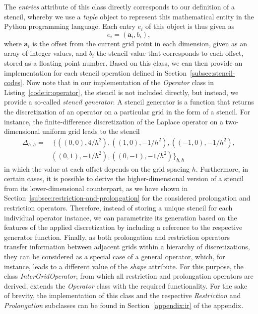 The \emph{entries} attribute of this class directly corresponds to our definition of a stencil, whereby we use a \emph{tuple} object to represent this mathematical entity in the Python programming language.
Each entry $e_i$ of this object is thus given as
\begin{equation}
	e_i = \left(\bm{a}_i, b_i \right),
\end{equation} 
where $\bm{a}_i$ is the offset from the current grid point in each dimension, given as an array of integer values, and $b_i$ the stencil value that corresponds to each offset, stored as a floating point number.
Based on this class, we can then provide an implementation for each stencil operation defined in Section~\ref{subsec:stencil-codes}.
Now note that in our implementation of the \emph{Operator} class in Listing~\ref{code:ir:operator}, the stencil is not included directly, but instead, we provide a so-called \emph{stencil generator}.
A stencil generator is a function that returns the discretization of an operator on a particular grid in the form of a stencil.
For instance, the finite-difference discretization of the Laplace operator on a two-dimensional uniform grid leads to the stencil 
\begin{equation*}
	\begin{split}
		\Delta_{h,h} = & \; \big\{ \left( \left( 0,0 \right), 4 / h^2 \right), \left(\left(1,0\right), -1/h^2\right), \left(\left(-1,0\right), -1 / h^2\right), \\ & \left(\left(0,1\right), -1/h^2\right), \left(\left(0,-1\right), -1/h^2\right) \big\}_{h,h}
	\end{split}
\end{equation*}
in which the value at each offset depends on the grid spacing $h$.
Furthermore, in certain cases, it is possible to derive the higher-dimensional version of a stencil from its lower-dimensional counterpart, as we have shown in Section~\ref{subsec:restriction-and-prolongation} for the considered prolongation and restriction operators.
Therefore, instead of storing a unique stencil for each individual operator instance, we can parametrize its generation based on the features of the applied discretization by including a reference to the respective generator function.
Finally, as both prolongation and restriction operators transfer information between adjacent grids within a hierarchy of discretizations, they can be considered as a special case of a general operator, which, for instance, leads to a different value of the \emph{shape} attribute.
For this purpose, the class \emph{InterGridOperator}, from which all restriction and prolongation operators are derived, extends the \emph{Operator} class with the required functionality.
For the sake of brevity, the implementation of this class and the respective \emph{Restriction} and \emph{Prolongation} subclasses can be found in Section~\ref{appendix:ir} of the appendix.

